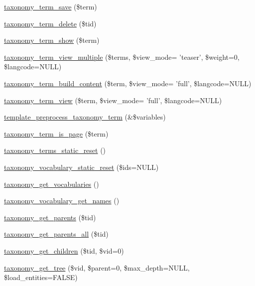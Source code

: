 \begin{DoxyCompactItemize}
\item 
\hyperlink{taxonomy_8module_a021a9a75f0cc742966ab5f2646a45ae4}{taxonomy\_\-term\_\-save} (\$term)
\item 
\hyperlink{taxonomy_8module_a4439428fa6a739b263aeef517a9f8876}{taxonomy\_\-term\_\-delete} (\$tid)
\item 
\hyperlink{taxonomy_8module_a6f503eb94771c54eca8b4529308f19b6}{taxonomy\_\-term\_\-show} (\$term)
\item 
\hyperlink{taxonomy_8module_aed779b4362d1a9002f18ed334254de66}{taxonomy\_\-term\_\-view\_\-multiple} (\$terms, \$view\_\-mode= 'teaser', \$weight=0, \$langcode=NULL)
\item 
\hyperlink{taxonomy_8module_a7acf51937f2dbe503ca3d9d317225066}{taxonomy\_\-term\_\-build\_\-content} (\$term, \$view\_\-mode= 'full', \$langcode=NULL)
\item 
\hyperlink{taxonomy_8module_a852150709c30aa1f36a2f50ffc26cf7a}{taxonomy\_\-term\_\-view} (\$term, \$view\_\-mode= 'full', \$langcode=NULL)
\item 
\hyperlink{taxonomy_8module_a7f112adf0c1b601f5a7e95fc58d583c8}{template\_\-preprocess\_\-taxonomy\_\-term} (\&\$variables)
\item 
\hyperlink{taxonomy_8module_a7a756c8de0de6b5cdc5c58cd89cda853}{taxonomy\_\-term\_\-is\_\-page} (\$term)
\item 
\hyperlink{taxonomy_8module_ae8bfe5c889200d0c3fed7b80d8f9d0f4}{taxonomy\_\-terms\_\-static\_\-reset} ()
\item 
\hyperlink{taxonomy_8module_a2f2ec1faf8c08ba104875d78649dc114}{taxonomy\_\-vocabulary\_\-static\_\-reset} (\$ids=NULL)
\item 
\hyperlink{taxonomy_8module_a61d3c2b09ef0247494b33fa01d8dafaa}{taxonomy\_\-get\_\-vocabularies} ()
\item 
\hyperlink{taxonomy_8module_a34d3bbed89236fda7b65952650389ed6}{taxonomy\_\-vocabulary\_\-get\_\-names} ()
\item 
\hyperlink{taxonomy_8module_ac16465f14f3bad994d0ec7789c80223c}{taxonomy\_\-get\_\-parents} (\$tid)
\item 
\hyperlink{taxonomy_8module_a049135d37e3c978e47997d35e8ab71bb}{taxonomy\_\-get\_\-parents\_\-all} (\$tid)
\item 
\hyperlink{taxonomy_8module_a6de09ab81dffb762ebfc66ff7b87d80f}{taxonomy\_\-get\_\-children} (\$tid, \$vid=0)
\item 
\hyperlink{taxonomy_8module_a8b1f135528885e6d843585a665ea1594}{taxonomy\_\-get\_\-tree} (\$vid, \$parent=0, \$max\_\-depth=NULL, \$load\_\-entities=FALSE)

\end{DoxyCompactItemize}
